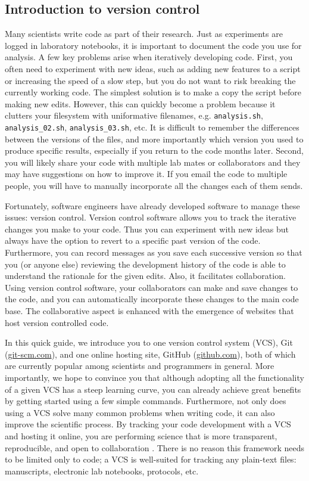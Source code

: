 \subsection{Introduction to version control}

Many scientists write code as part of their research.
Just as experiments are logged in laboratory notebooks, it is important to document the code you use for analysis.
A few key problems arise when iteratively developing code.
First, you often need to experiment with new ideas, such as adding new features to a script or increasing the speed of a slow step, but you do not want to risk breaking the currently working code.
The simplest solution is to make a copy the script before making new edits.
However, this can quickly become a problem because it clutters your filesystem with uniformative filenames, e.g. \verb|analysis.sh|, \verb|analysis_02.sh|, \verb|analysis_03.sh|, etc.
It is difficult to remember the differences between the versions of the files, and more importantly which version you used to produce specific results, especially if you return to the code months later.
Second, you will likely share your code with multiple lab mates or collaborators and they may have suggestions on how to improve it.
If you email the code to multiple people, you will have to manually incorporate all the changes each of them sends.

Fortunately, software engineers have already developed software to manage these issues: version control. 
Version control software allows you to track the iterative changes you make to your code.
Thus you can experiment with new ideas but always have the option to revert to a specific past version of the code.
Furthermore, you can record messages as you save each successive version so that you (or anyone else) reviewing the development history of the code is able to understand the rationale for the given edits.
Also, it facilitates collaboration.
Using version control software, your collaborators can make and save changes to the code, and you can automatically incorporate these changes to the main code base.
The collaborative aspect is enhanced with the emergence of websites that host version controlled code.

In this quick guide, we introduce you to one version control system (VCS), Git (\href{http://git-scm.com/}{git-scm.com}), and one online hosting site, GitHub (\href{https://github.com}{github.com}), both of which are currently popular among scientists and programmers in general.
More importantly, we hope to convince you that although adopting all the functionality of a given VCS has a steep learning curve, you can already achieve great benefits by getting started using a few simple commands.
Furthermore, not only does using a VCS solve many common problems when writing code, it can also improve the scientific process.
By tracking your code development with a VCS and hosting it online, you are performing science that is more transparent, reproducible, and open to collaboration \cite{23448176}.
There is no reason this framework needs to be limited only to code; a VCS is well-suited for tracking any plain-text files: manuscripts, electronic lab notebooks, protocols, etc.